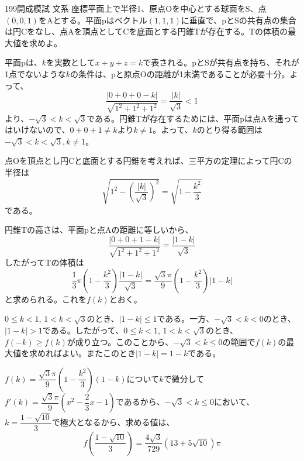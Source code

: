\begin{thm}{199}{}{開成模試 文系}
 座標平面上で半径1、原点Oを中心とする球面をS、点$(0,0,1)$をAとする。平面pはベクトル$(1,1,1)$に垂直で、pとSの共有点の集合は円Cをなし、点Aを頂点としてCを底面とする円錐Tが存在する。Tの体積の最大値を求めよ。
\end{thm}

平面pは、$k$を実数として$x+y+z=k$で表される。pとSが共有点を持ち、それが1点でないような$k$の条件は、pと原点Oの距離が1未満であることが必要十分。よって、
\[ \frac{|0+0+0-k|}{\sqrt{1^2+1^2+1^2}}=\frac{|k|}{\sqrt{3}} < 1 \]
より、$-\sqrt{3}<k<\sqrt{3}$である。円錐Tが存在するためには、平面pは点Aを通ってはいけないので、$0+0+1\neq k$より$k\neq 1$。よって、$k$のとり得る範囲は$-\sqrt{3}<k<\sqrt{3}, k\neq 1$。

点Oを頂点とし円Cと底面とする円錐を考えれば、三平方の定理によって円Cの半径は
\[ \sqrt{1^2-\left(\frac{|k|}{\sqrt{3}}\right)^2} = \sqrt{1-\frac{k^2}{3}} \]
である。

円錐Tの高さは、平面pと点Aの距離に等しいから、
\[ \frac{|0+0+1-k|}{\sqrt{1^2+1^2+1^2}}=\frac{|1-k|}{\sqrt{3}} \]
したがってTの体積は
\[ \frac{1}{3}\pi \left(1-\frac{k^2}{3}\right) \frac{|1-k|}{\sqrt{3}} = \frac{\sqrt{3}\pi}{9}\left(1-\frac{k^2}{3}\right)|1-k| \]
と求められる。これを$f(k)$とおく。

$0\le k < 1$, $1<k<\sqrt{3}$のとき、$|1-k|\le 1$である。一方、$-\sqrt{3}<k<0$のとき、$|1-k|>1$である。したがって、$0\le k<1$, $1<k<\sqrt{3}$のとき、$f(-k)\ge f(k)$が成り立つ。このことから、$-\sqrt{3}<k\le 0$の範囲で$f(k)$の最大値を求めればよい。またこのとき$|1-k|=1-k$である。

$f(k)=\dfrac{\sqrt{3}\pi}{9}\left(1-\dfrac{k^2}{3}\right)(1-k)$について$k$で微分して$f'(k)=\dfrac{\sqrt{3}\pi}{9}\left(x^2-\dfrac{2}{3}x-1\right)$であるから、$-\sqrt{3}<k\le 0$において、$k=\dfrac
{1-\sqrt{10}}{3}$で極大となるから、求める値は、
\[ f\left(\frac{1-\sqrt{10}}{3}\right) = \frac{4\sqrt{3}}{729}(13+5\sqrt{10})\pi \]